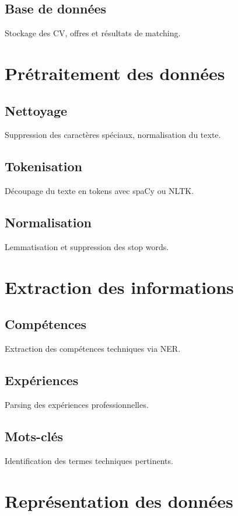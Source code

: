 \documentclass[12pt,a4paper]{report}
\begin{document}
\subsection{Base de données}
Stockage des CV, offres et résultats de matching.

\section{Prétraitement des données}

\subsection{Nettoyage}
Suppression des caractères spéciaux, normalisation du texte.

\subsection{Tokenisation}
Découpage du texte en tokens avec spaCy ou NLTK.

\subsection{Normalisation}
Lemmatisation et suppression des stop words.

\section{Extraction des informations}

\subsection{Compétences}
Extraction des compétences techniques via NER.

\subsection{Expériences}
Parsing des expériences professionnelles.

\subsection{Mots-clés}
Identification des termes techniques pertinents.

\section{Représentation des données}
\end{document}
